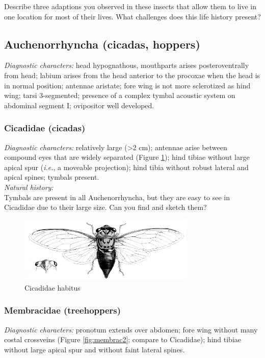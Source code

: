 \documentclass[letterpaper, 11pt]{article}
\begin{document}
\noindent{}Describe three adaptions you observed in these insects that allow them to live in one location for most of their lives. What challenges does this life history present?\\

\subsection{Auchenorrhyncha (cicadas, hoppers)}
\noindent{}\textit{Diagnostic characters:} head hypognathous, mouthparts arises posteroventrally from head; labium arises from the head anterior to the procoxae when the head is in normal position; antennae aristate; fore wing is not more sclerotized as hind wing; tarsi 3-segmented; presence of a complex tymbal acoustic system on abdominal segment I; ovipositor well developed.\\

\subsubsection{Cicadidae (cicadas)}
\noindent{}\textit{Diagnostic characters:} relatively large (\textgreater{}2 cm); antennae arise between compound eyes that are widely separated (Figure \ref{fig:cicadidae}); hind tibiae without large apical spur (\textit{i.e.}, a moveable projection); hind tibia without robust lateral and apical spines; tymbals present.\\

\noindent{}\textit{Natural history:} \\

\noindent{}Tymbals are present in all Auchenorrhyncha, but they are easy to see in Cicadidae due to their large size. Can you find and sketch them?

\begin{figure}[ht!]
 \centering
 \includegraphics[width=0.75\textwidth]{CicadidHabitus}
 \caption{Cicadidae habitus \citep[][Plate 100]{bhl33187}}
 \label{fig:cicadidae}
\end{figure}

\subsubsection{Membracidae (treehoppers)}
\noindent{}\textit{Diagnostic characters:} pronotum extends over abdomen; fore wing without many costal crossveins (Figure \ref{fig:membrac2}; compare to Cicadidae); hind tibiae without large apical spur and without faint lateral spines.\\
\end{document}
